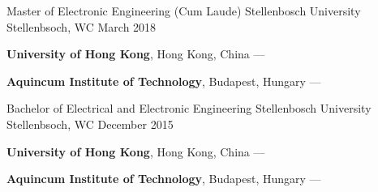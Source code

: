 
\begin{cventries}

  \cventry
    {Master of Electronic Engineering (Cum Laude)} %
    {Stellenbosch University} %
    {Stellenbsoch, WC} %
    {March 2018} %
    {
      \begin{cvitems} %
         \item {\textbf{University of Hong Kong}, Hong Kong, China --- }
         \vspace{0.5mm}
         \item {\textbf{Aquincum Institute of Technology}, Budapest, Hungary --- }
      \end{cvitems}
    }

  \cventry
    {Bachelor of Electrical and Electronic Engineering} %
    {Stellenbosch University} %
    {Stellenbsoch, WC} %
    {December 2015} %
    {
      \begin{cvitems} %
         \item {\textbf{University of Hong Kong}, Hong Kong, China --- }
         \vspace{0.5mm}
         \item {\textbf{Aquincum Institute of Technology}, Budapest, Hungary --- }
      \end{cvitems}
    }

    

\end{cventries}
